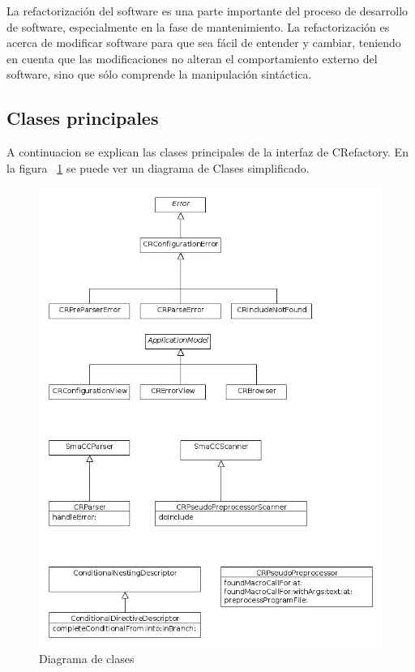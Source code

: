 \documentclass[a4paper,oneside,12pt]{article}
\begin{document}
La refactorización del software es una parte importante del proceso de desarrollo de software, especialmente en la fase de mantenimiento. La refactorización es acerca de modificar software para que sea fácil de entender y cambiar, teniendo en cuenta que las modificaciones no alteran el comportamiento externo del software, sino que sólo comprende la manipulación sintáctica.


\subsection{Clases principales}

A continuacion se explican las clases principales de la interfaz de CRefactory. En la figura ~\ref{diagrama_de_clases_2} se puede ver un diagrama de Clases simplificado.

\begin{figure}[h!]
  \centering
    \includegraphics[scale=0.58]{images/diagrama_de_clases3.jpg}
    \caption{Diagrama de clases}
    \label{diagrama_de_clases_2}
\end{figure}
\end{document}
